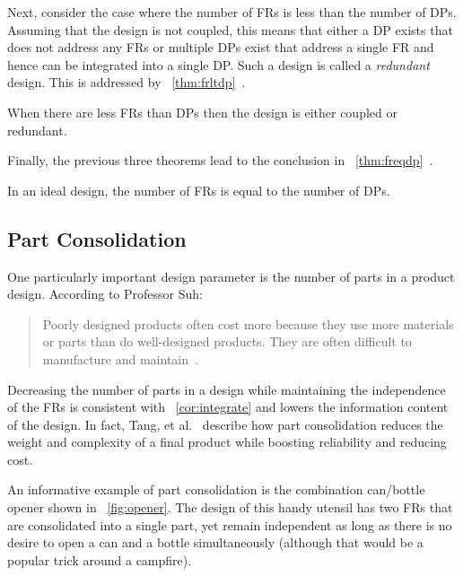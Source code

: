 Next, consider the case where the number of FRs is less than the number of DPs.  Assuming that the design is not
coupled, this means that either a DP exists that does not address any FRs or multiple DPs exist that address a
single FR and hence can be integrated into a single DP.  Such a design is called a \emph{redundant} design.  This
is addressed by \theoremname~\ref{thm:frltdp}~\cite{suh}.

\begin{theorem}
  \label{thm:frltdp}
  When there are less FRs than DPs then the design is either coupled or redundant.
\end{theorem}

Finally, the previous three theorems lead to the conclusion in \theoremname~\ref{thm:freqdp}~\cite{suh}.

\begin{theorem}
  \label{thm:freqdp}
  In an ideal design, the number of FRs is equal to the number of DPs.
\end{theorem}

\subsection{Part Consolidation}\label{sec:sub:parts}

One particularly important design parameter is the number of parts in a product design.  According to Professor
Suh:
\begin{quote}
  \vspace{-\baselineskip}
  Poorly designed products often cost more because they use more materials or parts than do well-designed products.
  They are often difficult to manufacture and maintain~\cite{suh}.
\end{quote}
Decreasing the number of parts in a design while maintaining the independence of the FRs is consistent with
\corollaryname~\ref{cor:integrate} and lowers the information content of the design.  In fact, Tang, et
al.~\cite{tang} describe how part consolidation reduces the weight and complexity of a final product while boosting
reliability and reducing cost.

An informative example of part consolidation is the combination can/bottle opener shown in
\figurename~\ref{fig:opener}.  The design of this handy utensil has two FRs that are consolidated into a single
part, yet remain independent as long as there is no desire to open a can and a bottle simultaneously (although that
would be a popular trick around a campfire).

